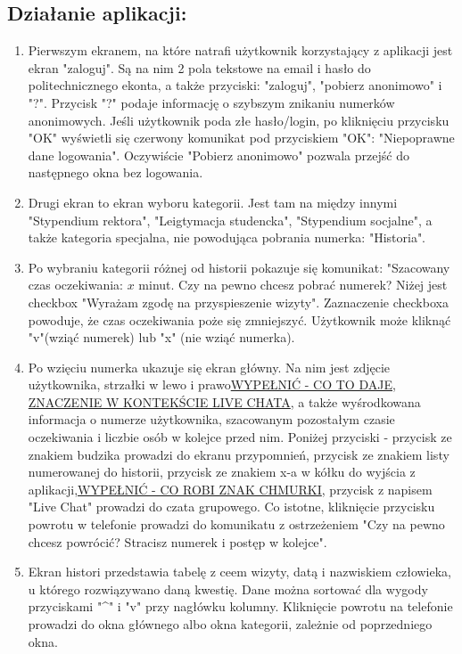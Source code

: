\documentclass[12pt]{article}
\begin{document}
\subsection{Działanie aplikacji:}
\begin {enumerate}
	\item Pierwszym ekranem, na które natrafi użytkownik korzystający z aplikacji jest ekran "zaloguj". Są na nim 2 pola tekstowe na email i hasło do politechnicznego ekonta, a także przyciski: "zaloguj", "pobierz anonimowo" i "?". Przycisk "?" podaje informację o szybszym znikaniu numerków anonimowych. Jeśli użytkownik poda złe hasło/login, po kliknięciu przycisku "OK" wyświetli się czerwony komunikat pod przyciskiem "OK": "Niepoprawne dane logowania". Oczywiście "Pobierz anonimowo" pozwala przejść do następnego okna bez logowania.
	
	\item Drugi ekran to ekran wyboru kategorii. Jest tam na między innymi "Stypendium rektora", "Leigtymacja studencka", "Stypendium socjalne", a także kategoria specjalna, nie powodująca pobrania numerka: "Historia".
	
	\item Po wybraniu kategorii różnej od historii pokazuje się komunikat: "Szacowany czas oczekiwania: ${x}$ minut. Czy na pewno chcesz pobrać numerek? Niżej jest checkbox "Wyrażam zgodę na przyspieszenie wizyty". Zaznaczenie checkboxa powoduje, że czas oczekiwania poże się zmniejszyć. Użytkownik może kliknąć "v"(wziąć numerek) lub "x" (nie wziąć numerka).
	
	\item Po wzięciu numerka ukazuje się ekran główny. Na nim jest zdjęcie użytkownika, strzałki w lewo i prawo\underline{WYPEŁNIĆ - CO TO DAJE, ZNACZENIE W KONTEKŚCIE LIVE CHATA}, a także wyśrodkowana informacja o numerze użytkownika, szacowanym pozostałym czasie oczekiwania i liczbie osób w kolejce przed nim. Poniżej przyciski - przycisk ze znakiem budzika prowadzi do ekranu przypomnień, przycisk ze znakiem listy numerowanej do historii, przycisk ze znakiem x-a w kółku do wyjścia z aplikacji,\underline{WYPEŁNIĆ - CO ROBI ZNAK CHMURKI}, przycisk z napisem "Live Chat" prowadzi do czata grupowego. Co istotne, kliknięcie przycisku powrotu w telefonie prowadzi do komunikatu z ostrzeżeniem "Czy na pewno chcesz powrócić? Stracisz numerek i postęp w kolejce".
	
	\item Ekran histori przedstawia tabelę z ceem wizyty, datą i nazwiskiem człowieka, u którego rozwiązywano daną kwestię. Dane można sortować dla wygody przyciskami "\^{}" i "v" przy nagłówku kolumny. Kliknięcie powrotu na telefonie prowadzi do okna głównego albo okna kategorii, zależnie od poprzedniego okna.
	

\end{enumerate}
\end{document}
